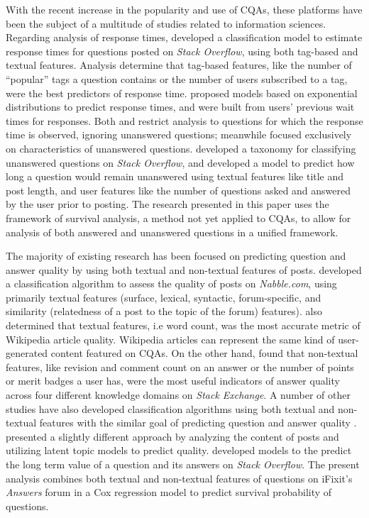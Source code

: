 \documentclass{article}
\begin{document}
With the recent increase in the popularity and use of CQAs, these platforms have been the subject of a multitude of studies related to information sciences. Regarding analysis of response times, \cite{Bhat2014} developed a classification model to estimate response times for questions posted on \textit{Stack Overflow}, using both tag-based and textual features. Analysis determine that tag-based features, like the number of ``popular'' tags a question contains or the number of users subscribed to a tag, were the best predictors of response time. \cite{Mahmud2013} proposed models based on exponential distributions to predict response times, and were built from users' previous wait times for responses.  Both \cite{Bhat2014} and \cite{Mahmud2013} restrict analysis to questions for which the response time is observed, ignoring unanswered questions; meanwhile \cite{Asaduzzaman2013} focused exclusively on characteristics of unanswered questions. \cite{Asaduzzaman2013} developed a taxonomy for classifying unanswered questions on \textit{Stack Overflow}, and developed a model to predict how long a question would remain unanswered using textual features like title and post length, and user features like the number of questions asked and answered by the user prior to posting. The research presented in this paper uses the framework of survival analysis, a method not yet applied to CQAs, to allow for analysis of both answered and unanswered questions in a unified framework. 

The majority of existing research has been focused on predicting question and answer quality by using both textual and non-textual features of posts. \cite{Weimer2007} developed a classification algorithm to assess the quality of posts on \textit{Nabble.com}, using primarily textual features (surface, lexical, syntactic, forum-specific, and similarity (relatedness of a post to the topic of the forum) features). \cite{Blumenstock} also determined that textual features, i.e word count, was the most accurate metric of Wikipedia article quality. Wikipedia articles can represent the same kind of user-generated content featured on CQAs. On the other hand, \cite{H.fu} found that non-textual features, like revision and comment count on an answer or the number of points or merit badges a user has, were the most useful indicators of answer quality across four different knowledge domains on \textit{Stack Exchange}. A number of other studies have also developed classification algorithms using both textual and non-textual features with the similar goal of predicting question and answer quality \cite{Yao2015} \cite{Toba2014} \cite{Ponzanelli2014a}. \cite{Ravi2014} presented a slightly different approach by analyzing the content of posts and utilizing latent topic models to predict quality. \cite{Anderson2012} developed models to the predict the long term value of a question and its answers on \textit{Stack Overflow}. The present analysis combines both textual and non-textual features of questions on iFixit's \textit{Answers} forum in a Cox regression model to predict survival probability of questions.
\end{document}
